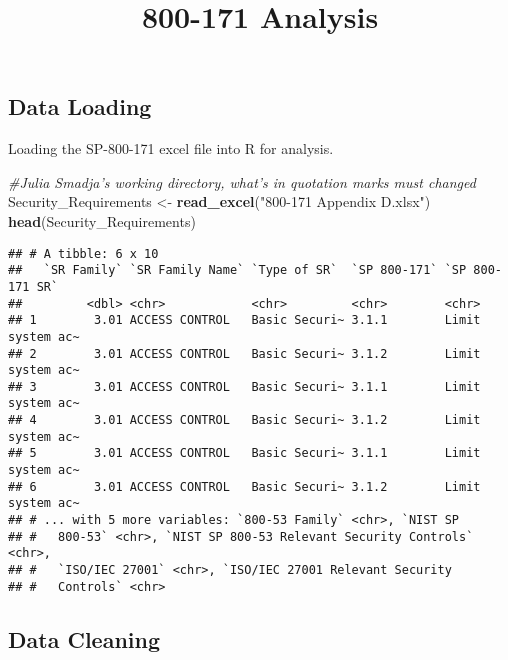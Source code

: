 \documentclass[]{article}
\title{800-171 Analysis}
\author{}
\date{}
\newenvironment{Shaded}{\begin{snugshade}}{\end{snugshade}}
\newcommand{\KeywordTok}[1]{\textcolor[rgb]{0.13,0.29,0.53}{\textbf{#1}}}
\newcommand{\StringTok}[1]{\textcolor[rgb]{0.31,0.60,0.02}{#1}}
\newcommand{\CommentTok}[1]{\textcolor[rgb]{0.56,0.35,0.01}{\textit{#1}}}
\newcommand{\NormalTok}[1]{#1}
\begin{document}
\maketitle

\subsection{Data Loading}\label{data-loading}

Loading the SP-800-171 excel file into R for analysis.

\begin{Shaded}
\begin{Highlighting}[]
\CommentTok{#Julia Smadja's working directory, what's in quotation marks must changed}
\NormalTok{Security_Requirements <-}\StringTok{ }\KeywordTok{read_excel}\NormalTok{(}\StringTok{"800-171 Appendix D.xlsx"}\NormalTok{) }
\KeywordTok{head}\NormalTok{(Security_Requirements)}
\end{Highlighting}
\end{Shaded}

\begin{verbatim}
## # A tibble: 6 x 10
##   `SR Family` `SR Family Name` `Type of SR`  `SP 800-171` `SP 800-171 SR` 
##         <dbl> <chr>            <chr>         <chr>        <chr>           
## 1        3.01 ACCESS CONTROL   Basic Securi~ 3.1.1        Limit system ac~
## 2        3.01 ACCESS CONTROL   Basic Securi~ 3.1.2        Limit system ac~
## 3        3.01 ACCESS CONTROL   Basic Securi~ 3.1.1        Limit system ac~
## 4        3.01 ACCESS CONTROL   Basic Securi~ 3.1.2        Limit system ac~
## 5        3.01 ACCESS CONTROL   Basic Securi~ 3.1.1        Limit system ac~
## 6        3.01 ACCESS CONTROL   Basic Securi~ 3.1.2        Limit system ac~
## # ... with 5 more variables: `800-53 Family` <chr>, `NIST SP
## #   800-53` <chr>, `NIST SP 800-53 Relevant Security Controls` <chr>,
## #   `ISO/IEC 27001` <chr>, `ISO/IEC 27001 Relevant Security
## #   Controls` <chr>
\end{verbatim}

\subsection{Data Cleaning}\label{data-cleaning}
\end{document}

